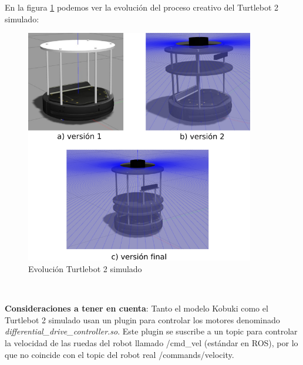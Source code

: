 En la figura \ref{fig:evolucion_turtlebot2_sim} podemos ver la evolución del proceso creativo del Turtlebot 2 simulado:
\begin{figure} [H]
  \begin{center}
    \includegraphics[width=10cm]{imagenes/creacion-turtlebot2-sim.png}
  \end{center}
  \caption[Evolución Turtlebot 2 simulado]{Evolución Turtlebot 2 simulado}
  \label{fig:evolucion_turtlebot2_sim}
\end{figure}\


\textbf{Consideraciones a tener en cuenta}: Tanto el modelo Kobuki como el Turtlebot 2 simulado usan un plugin para controlar los motores denominado \textit{differential\_drive\_controller.so}. Este plugin se suscribe a un topic para controlar la velocidad de las ruedas del robot llamado /cmd\_vel (estándar en ROS), por lo que no coincide con el topic del robot real /commands/velocity.


